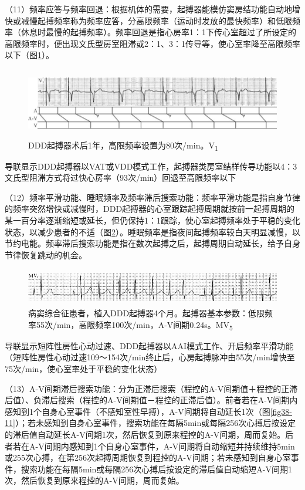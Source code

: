 （11）频率应答与频率回退：根据机体的需要，起搏器能模仿窦房结功能自动地增快或减慢起搏频率称为频率应答，分高限频率（运动时发放的最快频率）和低限频率（休息时最慢的起搏频率）。频率回退是指心房率1：1下传心室超过了所设定的高限频率时，便出现文氏型房室阻滞或2：1、3：1传导等，使心室率降至高限频率以下（图\ref{fig38-9}）。

\begin{figure}[!htbp]
 \centering
 \includegraphics[width=5.82292in,height=1.19792in]{./images/Image00612.jpg}
 \captionsetup{justification=centering}
 \caption{DDD起搏器术后1年，高限频率设置为80次/min。V\textsubscript{1}}
 \label{fig38-9}
  \end{figure} 
导联显示DDD起搏器以VAT或VDD模式工作，起搏器类房室结样传导功能以4：3文氏型阻滞方式将过快心房率（93次/min）回退至高限频率以下

（12）频率平滑功能、睡眠频率及频率滞后搜索功能：频率平滑功能是指自身节律的频率突然增快或减慢时，DDD起搏器的心室跟踪起搏周期就按前一起搏周期的某一百分率逐渐缩短或延长，但仍保持1：1跟踪，使心室起搏频率处于平稳的变化状态，以减少患者的不适（图\ref{fig38-10}）。睡眠频率是指夜间起搏频率较白天明显减慢，以节约电能。频率滞后搜索功能是指在数次起搏之后，起搏周期自动延长，给予自身节律恢复跳动的机会。

\begin{figure}[!htbp]
 \centering
 \includegraphics[width=5.58333in,height=0.63542in]{./images/Image00613.jpg}
 \captionsetup{justification=centering}
 \caption{病窦综合征患者，植入DDD起搏器4个月。起搏器基本参数：低限频率55次/min，高限频率100次/min，A-V间期0.24s。MV\textsubscript{5}}
 \label{fig38-10}
  \end{figure} 
导联显示短阵性房性心动过速、DDD起搏器以AAI模式工作、开启频率平滑功能（短阵性房性心动过速109～154次/min终止后，心房起搏脉冲由55次/min增快至75次/min，使心室率处于平稳的变化状态）

（13）A-V间期滞后搜索功能：分为正滞后搜索（程控的A-V间期值＋程控的正滞后值）、负滞后搜索（程控的A-V间期值－程控的正滞后值）。前者若在A-V间期内感知到1个自身心室事件（不感知室性早搏），A-V间期将自动延长1次（图\ref{fig38-11}）；若未感知到自身心室事件，搜索功能在每隔5min或每隔256次心搏后按设定的滞后值自动延长A-V间期1次，然后恢复到原来程控的A-V间期，周而复始。后者若在A-V间期内感知到1个自身心室事件，A-V间期将自动缩短并持续维持5min或255次心搏，在第256次起搏周期恢复到程控的A-V间期；若未感知到自身心室事件，搜索功能在每隔5min或每隔256次心搏后按设定的滞后值自动缩短A-V间期1次，然后恢复到原来程控的A-V间期，周而复始。

